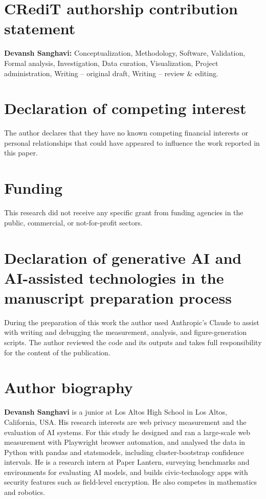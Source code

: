 \section*{CRediT authorship contribution statement}
\textbf{Devansh Sanghavi:} Conceptualization, Methodology, Software, Validation, Formal analysis, Investigation, Data curation, Visualization, Project administration, Writing -- original draft, Writing -- review \& editing.

\section*{Declaration of competing interest}
The author declares that they have no known competing financial interests or personal relationships that could have appeared to influence the work reported in this paper.

\section*{Funding}
This research did not receive any specific grant from funding agencies in the public, commercial, or not-for-profit sectors.

\section*{Declaration of generative AI and AI-assisted technologies in the manuscript preparation process}
During the preparation of this work the author used Anthropic's Claude to assist with writing and debugging the measurement, analysis, and figure-generation scripts. The author reviewed the code and its outputs and takes full responsibility for the content of the publication.




\section*{Author biography}
\noindent\textbf{Devansh Sanghavi} is a junior at Los Altos High School in Los Altos, California, USA. His research interests are web privacy measurement and the evaluation of AI systems. For this study he designed and ran a large-scale web measurement with Playwright browser automation, and analysed the data in Python with pandas and statsmodels, including cluster-bootstrap confidence intervals. He is a research intern at Paper Lantern, surveying benchmarks and environments for evaluating AI models, and builds civic-technology apps with security features such as field-level encryption. He also competes in mathematics and robotics.
